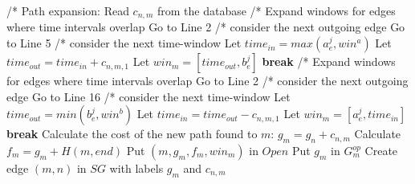 \documentclass{article}
\begin{document}
\begin{algorithm}
	\caption{Path expansion}\label{A4}
	  /* Path expansion: \;
            {
            Read $c_{n,m}$ from the database \;
                {
                {
                /* Expand windows for edges where time intervals overlap \;
                    {
                    Go to Line 2 /* consider the next outgoing edge\;
                    }
                    {
                    Go to Line 5 /* consider the next time-window \;
                    }
                Let $time_{in}=max(a_e^j,win^a)$ \;
                Let $time_{out}=time_{in}+c_{n,m,1}$ \;
                    {
                    Let $win_m=[time_{out}, b_e^j]$
                    \textbf{break} \;
                    }
                }
                }
            \Else
                {
                {
                /* Expand windows for edges where time intervals overlap \;
                    {
                    Go to Line 2 /* consider the next outgoing edge\;
                    }
                    {
                    Go to Line 16 /* consider the next time-window \;
                    }
                Let $time_{out}=min(b_e^j,win^b)$ \;
                Let $time_{in}=time_{out}-c_{n,m,1}$ \;
                    {
                    Let $win_m=[a_e^j, time_{in}]$
                    \textbf{break} \;
                    }
                }
                }
            Calculate the cost of the new path found to $m$: $g_m=g_n+c_{n,m}$ \;
                {
                Calculate $f_m=g_m+H(m,end)$ \;
                    {
                    Put $(m,g_m,f_m,win_m)$ in $Open$ \;
                    Put $g_m$ in $G_{m}^{op}$ \;
                    Create edge $(m,n)$ in $SG$ with labels $g_m$ and $c_{n,m}$ \;
                    }
                }
}
\end{algorithm}
\end{document}
